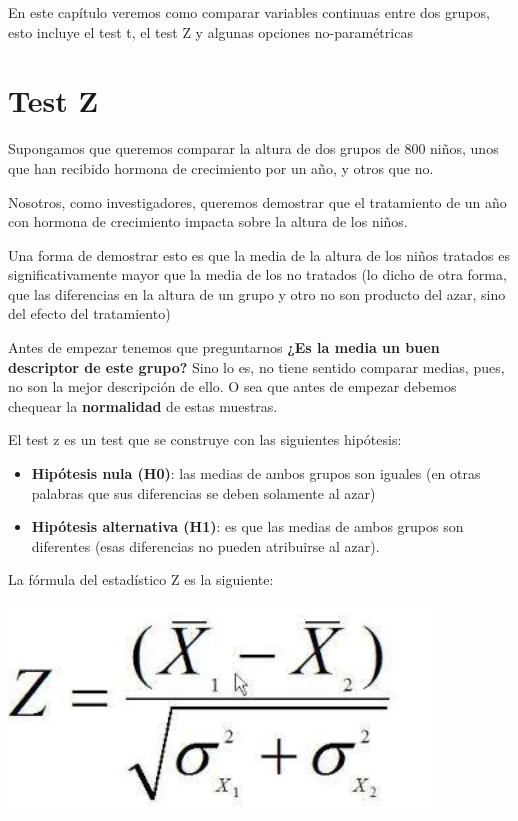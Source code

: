 \documentclass[
]{book}
\begin{document}
En este capítulo veremos como comparar variables continuas entre dos grupos, esto incluye el test t, el test Z y algunas opciones no-paramétricas

\hypertarget{test-z}{%
\section{Test Z}\label{test-z}}

Supongamos que queremos comparar la altura de dos grupos de 800 niños, unos que han recibido hormona de crecimiento por un año, y otros que no.

Nosotros, como investigadores, queremos demostrar que el tratamiento de un año con hormona de crecimiento impacta sobre la altura de los niños.

Una forma de demostrar esto es que la media de la altura de los niños tratados es significativamente mayor que la media de los no tratados (lo dicho de otra forma, que las diferencias en la altura de un grupo y otro no son producto del azar, sino del efecto del tratamiento)

Antes de empezar tenemos que preguntarnos \textbf{¿Es la media un buen descriptor de este grupo?} Sino lo es, no tiene sentido comparar medias, pues, no son la mejor descripción de ello. O sea que antes de empezar debemos chequear la \textbf{normalidad} de estas muestras.

El test z es un test que se construye con las siguientes hipótesis:

\begin{itemize}
\item
  \textbf{Hipótesis nula (H0)}: las medias de ambos grupos son iguales (en otras palabras que sus diferencias se deben solamente al azar)
\item
  \textbf{Hipótesis alternativa (H1)}: es que las medias de ambos grupos son diferentes (esas diferencias no pueden atribuirse al azar).
\end{itemize}

La fórmula del estadístico Z es la siguiente:

\includegraphics[width=4.46in]{img/z}
\end{document}
